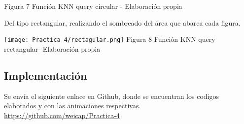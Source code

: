 \documentclass{article}
\begin{document}
 \center Figura 7 Función KNN query circular - Elaboración propia\\
 \begin{flushleft}
 Del tipo rectangular, realizando el sombreado del área que abarca cada figura.\\
 \end{flushleft} 
  \center\texttt{[image: Practica 4/rectagular.png]}
 \center Figura 8 Función KNN query rectangular- Elaboración propia
 \begin{flushleft}
\section{Implementación}
Se envía el siguiente enlace en Github, donde se encuentran los codigos elaborados y con las animaciones respectivas.\\
\url{https://github.com/weicap/Practica-4}
 \end{flushleft} 
\end{document}
